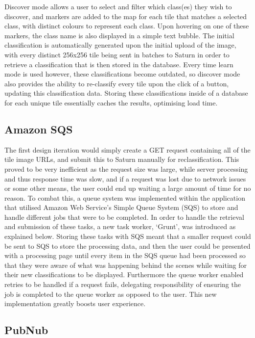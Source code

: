 Discover mode allows a user to select and filter which class(es) they wish to discover, and markers are added to the map for each tile that matches a selected class, with distinct colours to represent each class. Upon hovering on one of these markers, the class name is also displayed in a simple text bubble. The initial classification is automatically generated upon the initial upload of the image, with every distinct 256x256 tile being sent in batches to Saturn in order to retrieve a classification that is then stored in the database. Every time learn mode is used however, these classifications become outdated, so discover mode also provides the ability to re-classify every tile upon the click of a button, updating this classification data. Storing these classifications inside of a database for each unique tile essentially caches the results, optimising load time.

\subsection{Amazon SQS}

The first design iteration would simply create a GET request containing all of the tile image URLs, and submit this to Saturn manually for reclassification. This proved to be very inefficient as the request size was large, while server processing and thus response time was slow, and if a request was lost due to network issues or some other means, the user could end up waiting a large amount of time for no reason. To combat this, a queue system was implemented within the application that utilised Amazon Web Service’s Simple Queue System (SQS) to store and handle different jobs that were to be completed. In order to handle the retrieval and submission of these tasks, a new task worker, ‘Grunt’, was introduced as explained below. Storing these tasks with SQS meant that a smaller request could be sent to SQS to store the processing data, and then the user could be presented with a processing page until every item in the SQS queue had been processed so that they were aware of what was happening behind the scenes while waiting for their new classifications to be displayed. Furthermore the queue worker enabled retries to be handled if a request fails, delegating responsibility of ensuring the job is completed to the queue worker as opposed to the user. This new implementation greatly boosts user experience.

\subsection{PubNub}

